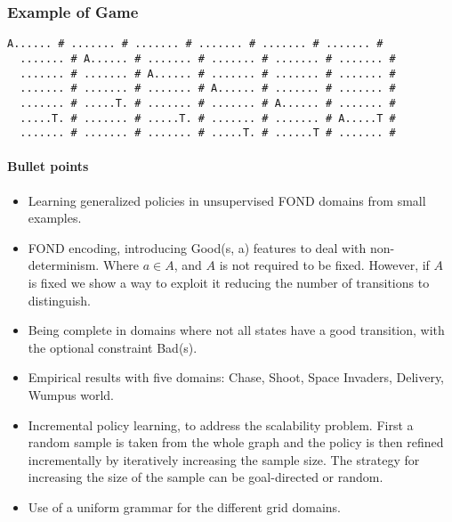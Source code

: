 \documentclass[a4paper]{article}
\begin{document}
\subsubsection{Example of Game}
\begin{Verbatim}[fontsize=\footnotesize]
  A...... # ....... # ....... # ....... # ....... # ....... #
  ....... # A...... # ....... # ....... # ....... # ....... #
  ....... # ....... # A...... # ....... # ....... # ....... #
  ....... # ....... # ....... # A...... # ....... # ....... #
  ....... # .....T. # ....... # ....... # A...... # ....... #
  .....T. # ....... # .....T. # ....... # ....... # A.....T #
  ....... # ....... # ....... # .....T. # ......T # ....... #
\end{Verbatim}


\newpage

\paragraph{Bullet points}
\begin{itemize}
\item Learning generalized policies in unsupervised FOND domains from small examples.
\item FOND encoding, introducing Good(s, a) features to deal with non-determinism. Where $a \in A$, and $A$ is not required to be fixed. However, if $A$ is fixed we show a way to exploit it reducing the number of transitions to distinguish.
\item Being complete in domains where not all states have a good transition, with the optional constraint Bad(s).
\item Empirical results with five domains: Chase, Shoot, Space Invaders, Delivery, Wumpus world.
\item Incremental policy learning, to address the scalability problem. First a random sample is taken from the whole graph and the policy is then refined incrementally by iteratively increasing the sample size. The strategy for increasing the size of the sample can be goal-directed or random.
\item Use of a uniform grammar for the different grid domains.
\end{itemize}




\end{document}
